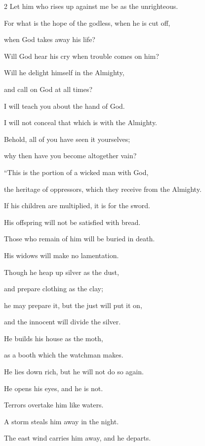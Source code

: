 \begin{multicols}{2}
	Let him who rises up against me be as the unrighteous.
	
		\vspace{\baselineskip}
	
	\myverse{}For what is the hope of the godless, when he is cut off,
	
	when God takes away his life?
	
	\myverse{}Will God hear his cry when trouble comes on him?
	
	\myverse{}Will he delight himself in the Almighty,
	
	and call on God at all times?
	
	\myverse{}I will teach you about the hand of God.
	
	I will not conceal that which is with the Almighty.
	
	\myverse{}Behold, all of you have seen it yourselves;
	
	why then have you become altogether vain?
	
		\vspace{\baselineskip}
	
	
	\myverse{}“This is the portion of a wicked man with God,
	
	the heritage of oppressors, which they receive from the Almighty.
	
	\myverse{}If his children are multiplied, it is for the sword.
	
	His offspring will not be satisfied with bread.
	
	\myverse{}Those who remain of him will be buried in death.
	
	His widows will make no lamentation.
	
	\myverse{}Though he heap up silver as the dust,
	
	and prepare clothing as the clay;
	
	\myverse{}he may prepare it, but the just will put it on,
	
	and the innocent will divide the silver.
	
	\myverse{}He builds his house as the moth,
	
	as a booth which the watchman makes.
	
	\myverse{}He lies down rich, but he will not do so again.
	
	He opens his eyes, and he is not.
	
	\myverse{}Terrors overtake him like waters.
	
	A storm steals him away in the night.
	
	\myverse{}The east wind carries him away, and he departs.
	

\end{multicols}
